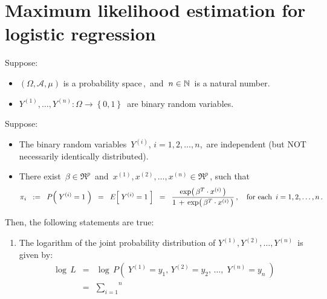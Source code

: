 

\section{Maximum likelihood estimation for logistic regression}
\setcounter{theorem}{0}
\setcounter{equation}{0}

\renewcommand{\theenumi}{\roman{enumi}}
\renewcommand{\labelenumi}{\textnormal{(\theenumi)}$\;\;$}


\begin{proposition}
\mbox{}\vskip 0.1cm\noindent
Suppose:
\begin{itemize}
\item
	$\left(\Omega,\mathcal{A},\mu\right)$ is a probability space\,,
	\,and
	\,$n \in \mathbb{N}$\, is a natural number.
\item
	$Y^{(1)}, \ldots, Y^{(n)} : \Omega \longrightarrow \left\{0,1\right\}$\,
	are binary random variables.
\end{itemize}
Suppose:
\begin{itemize}
\item
	The binary random variables \,$Y^{(i)}$, $i = 1, 2, \ldots, n$,\,
	are independent (but NOT necessarily identically distributed).
\item
	There exist
	\,$\beta \in \Re^{p}$\,
	and
	\,$x^{(1)}, x^{(2)}, \ldots, x^{(n)} \in \Re^{p}$\,,
	such that
	\begin{equation*}
	\pi_{i}
	\;\; := \;\;
		P\!\left(\; Y^{(i)} = 1 \;\right)
	\;\; = \;\;
		E\!\left[\; Y^{(i)}  = 1 \;\right]
	\;\; = \;\;
		\dfrac{
			\exp\!\left(\,\beta^{T} \cdot x^{(i)} \,\right)
			}{
			1 \,+\, \exp\!\left(\,\beta^{T} \cdot x^{(i)} \,\right)
			}\,,
	\quad
	\textnormal{for each \,$i = 1,2,\ldots,n$}\,.
	\end{equation*}
\end{itemize}
Then, the following statements are true:
\begin{enumerate}
\item
	The logarithm of the joint probability distribution of
	\;$Y^{(1)},Y^{(2)},\ldots,Y^{(n)}$\, is given by:
	\begin{eqnarray*}
	\log\,L
		&=&
		\log\,P\!\left(\; Y^{(1)}=y_{1},\,Y^{(2)}=y_{2},\,\ldots,\;Y^{(n)}=y_{n} \;\right)
	\\
	&=&
		\overset{n}{\underset{i=1}{\sum}}\,

\end{eqnarray*}
\end{enumerate}
\end{proposition}
